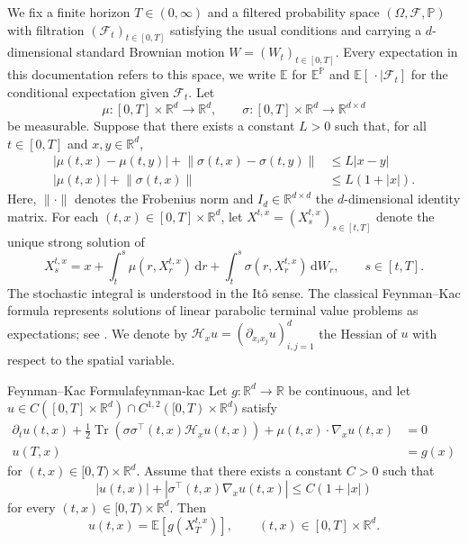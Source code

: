 ﻿\documentclass[10pt,a4paper]{article}
\begin{document}
We fix a finite horizon $T\in(0,\infty)$ and a filtered probability
space \((\Omega,\mathcal F,\mathbb P)\) with filtration $(\mathcal F_t)_{t\in[0,T]}$ satisfying the usual conditions and carrying a $d$-dimensional standard Brownian motion $W=(W_t)_{t\in[0,T]}$. Every expectation in this documentation refers to this space, we write $\mathbb E$ for $\mathbb E^{\mathbb P}$ and $\mathbb E[\,\cdot\mid\mathcal F_t]$ for the conditional expectation given $\mathcal F_t$. Let
\[
\mu\colon[0,T]\times\mathbb R^d\to\mathbb R^d,
\qquad
\sigma\colon[0,T]\times\mathbb R^d\to\mathbb R^{d\times d}
\]
be measurable. Suppose that there exists a constant $L>0$ such that, for all $t\in[0,T]$ and $x,y\in\mathbb R^d$,
\begin{align*}
\lvert\mu(t,x)-\mu(t,y)\rvert
+\lVert\sigma(t,x)-\sigma(t,y)\rVert
&\leq L\lvert x-y\rvert \\
\lvert\mu(t,x)\rvert+\lVert\sigma(t,x)\rVert
&\leq L(1+\lvert x\rvert).
\end{align*}
Here, $\lVert\cdot\rVert$ denotes the Frobenius norm and $I_d\in\mathbb R^{d\times d}$ the $d$-dimensional identity matrix. For each
$(t,x)\in[0,T]\times\mathbb R^d$, let
$X^{t,x}=(X_s^{t,x})_{s\in[t,T]}$ denote the unique strong solution of
\begin{equation*}
X_s^{t,x}
=
x+\int_t^s\mu(r,X_r^{t,x})\,\mathrm dr
+\int_t^s\sigma(r,X_r^{t,x})\,\mathrm dW_r,
\qquad s\in[t,T].
\end{equation*}
The stochastic integral is understood in the It\^o sense. The classical Feynman--Kac formula represents solutions of linear parabolic terminal value problems as expectations; see \cite[Chapter~8]{Oksendal2003}. We denote by
$\mathcal H_xu=(\partial_{x_i x_j}u)_{i,j=1}^d$ the Hessian of $u$ with
respect to the spatial variable.
\begin{theorem}[breakable]{Feynman--Kac Formula}{feynman-kac}
Let $g\colon\mathbb R^d\to\mathbb R$ be continuous, and let \(u\in C([0,T]\times\mathbb R^d)
   \cap C^{1,2}([0,T)\times\mathbb R^d)\) satisfy
\begin{align*}
\partial_tu(t,x)
+\frac12\operatorname{Tr}\!\left(
  \sigma\sigma^\top(t,x)\mathcal H_xu(t,x)
 \right)
+\mu(t,x)\cdot\nabla_xu(t,x)
&=0 \\
u(T,x)&=g(x) 
\end{align*}
for $ (t,x)\in[0,T)\times\mathbb R^d.$ Assume that there exists a constant $C>0$ such that
\[
\lvert u(t,x)\rvert
+\left\lvert
  \sigma^\top(t,x)\nabla_xu(t,x)
 \right\rvert
\leq C(1+\lvert x\rvert)
\]
for every $(t,x)\in[0,T)\times\mathbb R^d$. Then
\[
u(t,x)
=
\mathbb E
\left[g\!\left(X_T^{t,x}\right)\right],
\qquad (t,x)\in[0,T]\times\mathbb R^d.
\]
\end{theorem}
\end{document}
